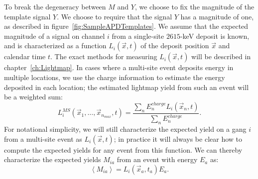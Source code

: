 To break the degeneracy between $M$ and $Y$, we choose to fix the magnitude of the template signal $Y$.  We choose to require that the signal $Y$ has a magnitude of one, as described in figure~\ref{fig:SampleAPDTemplates}.  We assume that the expected magnitude of a signal on channel $i$ from a single-site $2615$-keV deposit is known, and is characterized as a function $L_i(\vec{x}, t)$ of the deposit position $\vec{x}$ and calendar time $t$.  The exact methods for measuring $L_i(\vec{x}, t)$ will be described in chapter~\ref{ch:Lightmap}.  In cases where a multi-site event deposits energy in multiple locations, we use the charge information to estimate the energy deposited in each location; the estimated lightmap yield from such an event will be a weighted sum:
\begin{equation}
L_i^{MS}(\vec{x}_1, \dots, \vec{x}_{n_{max}}, t) = \frac{\sum_n E_n^{charge} L_i(\vec{x}_n, t)}{\sum_n E_n^{charge}}.
\end{equation}
For notational simplicity, we will still characterize the expected yield on a gang $i$ from a multi-site event as $L_i(\vec{x}, t)$; in practice it will always be clear how to compute the expected yields for any event from this function.  We can thereby characterize the expected yields $M_{ia}$ from an event with energy $E_a$ as:
\begin{equation}
\left< M_{ia} \right> = L_i(\vec{x}_a, t_a) E_a.
\end{equation}


